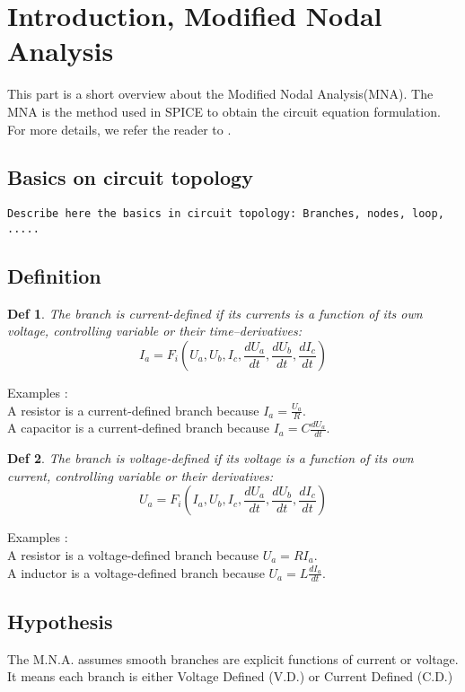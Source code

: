 
 
\section{Introduction, Modified Nodal Analysis}
This part is a short overview about the Modified Nodal Analysis(MNA). The MNA is the method used
in SPICE to obtain the circuit equation formulation. For more details, we refer the reader to \cite{Ogrodzki1994}.

\subsection{Basics on circuit topology}

{\tt Describe here the basics in circuit topology: Branches, nodes, loop, .....}

\subsection{Definition}
\newtheorem{mur}{Def}
\begin{mur}
The branch is current-defined if its currents is a function of its own voltage, controlling variable
or their time--derivatives:
\begin{equation}\label{CD}I_{a}=F_{i}(U_{a},U_{b},I_{c},\frac{dU_a}{dt},\frac{dU_b}{dt},\frac{dI_{c}}{dt})\end{equation}
\end{mur}
Examples : \\
A resistor is a current-defined branch because $I_{a}=\frac{U_{a}}{R}$.\\
A capacitor is a current-defined branch because $I_{a}=C\frac{dU_{a}}{dt}$.\\
\begin{mur}
The branch is voltage-defined if its voltage is a function of its own current, controlling variable
or their derivatives:
\begin{equation}\label{VD}U_{a}=F_{i}(I_{a},U_{b},I_{c},\frac{dU_a}{dt},\frac{dU_b}{dt},\frac{dI_{c}}{dt})\end{equation}
\end{mur}
Examples : \\
A resistor is a voltage-defined branch because $U_{a}=RI_{a}$.\\
A inductor is a voltage-defined branch because $U_{a}=L\frac{dI_{a}}{dt}$.\\
\subsection{Hypothesis}
The M.N.A. assumes smooth branches are explicit functions of current or voltage. It means each branch is either Voltage Defined (V.D.) or Current Defined (C.D.)\\
